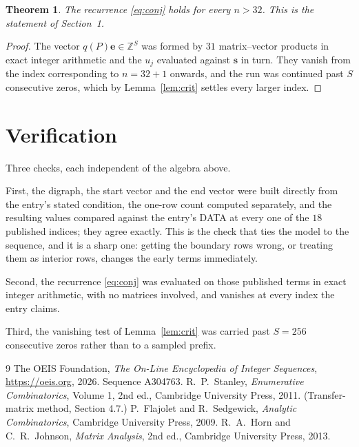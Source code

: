 \documentclass[11pt,a4paper]{article}
\theoremstyle{plain}
\newtheorem{theorem}{Theorem}
\theoremstyle{definition}
\begin{document}
\begin{theorem}
The recurrence \eqref{eq:conj} holds for every $n>32$. This is the statement of
Section~1.
\end{theorem}

\begin{proof}
The vector $q(P)\mathbf{e}\in\mathbb{Z}^{S}$ was formed by $31$ matrix--vector
products in exact integer arithmetic and the $u_j$ evaluated against $\mathbf{s}$ in turn.
They vanish from the index corresponding to $n=32+1$ onwards, and the run was continued
past $S$ consecutive zeros, which by Lemma~\ref{lem:crit} settles every larger index.
\end{proof}

\section{Verification}

Three checks, each independent of the algebra above.

First, the digraph, the start vector and the end vector were built directly from the
entry's stated condition, the one-row count computed separately, and the resulting values
compared against the entry's DATA at every one of the $18$ published indices; they
agree exactly. This is the check that ties the model to the sequence, and it is a sharp one:
getting the boundary rows wrong, or treating them as interior rows, changes the early terms
immediately.

Second, the recurrence \eqref{eq:conj} was evaluated on those published terms in exact
integer arithmetic, with no matrices involved, and vanishes at every index the entry claims.

Third, the vanishing test of Lemma~\ref{lem:crit} was carried past $S=256$ consecutive
zeros rather than to a sampled prefix.

\begin{thebibliography}{9}
 The OEIS Foundation, \emph{The On-Line Encyclopedia of Integer
Sequences}, \url{https://oeis.org}, 2026. Sequence A304763.
 R.~P.~Stanley, \emph{Enumerative Combinatorics}, Volume 1, 2nd ed.,
Cambridge University Press, 2011. (Transfer-matrix method, Section 4.7.)
 P.~Flajolet and R.~Sedgewick, \emph{Analytic Combinatorics}, Cambridge
University Press, 2009.
 R.~A.~Horn and C.~R.~Johnson, \emph{Matrix Analysis}, 2nd ed., Cambridge
University Press, 2013.
\end{thebibliography}
\end{document}
